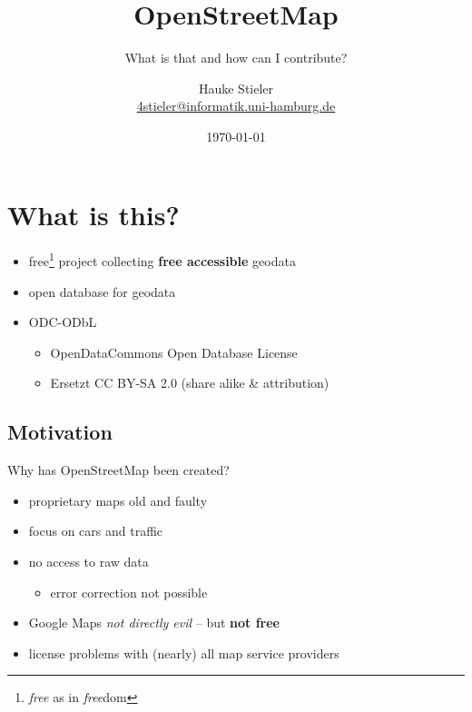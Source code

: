 \documentclass{beamer}
\title{OpenStreetMap}
\subtitle{What is that and how can I contribute?}
\author{Hauke Stieler\\\href{mailto:4stieler@informatik.uni-hamburg.de}{4stieler@informatik.uni-hamburg.de}}
\date{\today}
\begin{document}
	\maketitle
	
	\begin{frame}
		\tableofcontents
	\end{frame}

	\section{What is this?}
	
	\begin{frame}
		\begin{itemize}
			\item free\footnote{\textit{free} as in \textit{free}dom} project collecting \textbf{free accessible} geodata
			\item open database for geodata
			\item ODC-ODbL
			\begin{itemize}
				\item OpenDataCommons Open Database License
				\item Ersetzt CC BY-SA 2.0 {\tiny (share alike \& attribution)}
			\end{itemize}
		\end{itemize}
	\end{frame}

	\subsection{Motivation}
	
	\begin{frame}
		Why has OpenStreetMap been created?
		\begin{itemize}
			\item proprietary maps old and faulty
			\item focus on cars and traffic
			\item no access to raw data
			\begin{itemize}
				\item error correction not possible
			\end{itemize}
			\item Google Maps \textit{not directly evil} -- but \textbf{not free}
			\item license problems with (nearly) all map service providers
		\end{itemize}
	\end{frame}
\end{document}
